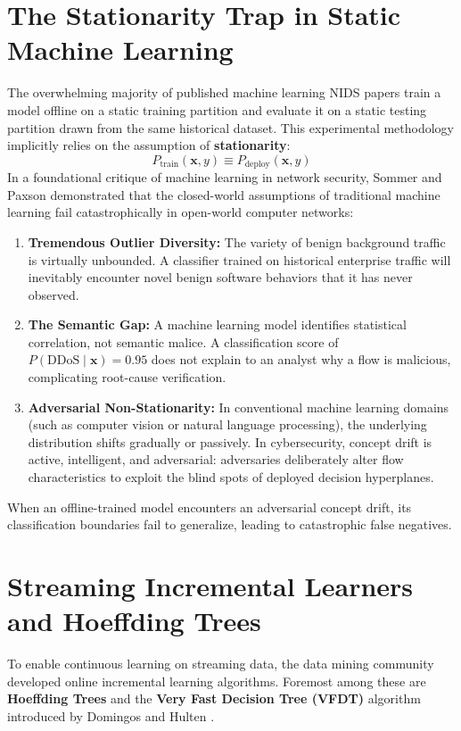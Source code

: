 \documentclass[12pt,a4paper,oneside]{report}
\begin{document}
\section{The Stationarity Trap in Static Machine Learning}
The overwhelming majority of published machine learning NIDS papers train a model offline on a static training partition and evaluate it on a static testing partition drawn from the same historical dataset. This experimental methodology implicitly relies on the assumption of \textbf{stationarity}:
\begin{equation}
P_{\text{train}}(\mathbf{x}, y) \equiv P_{\text{deploy}}(\mathbf{x}, y)
\end{equation}
In a foundational critique of machine learning in network security, Sommer and Paxson \cite{sommer2010} demonstrated that the closed-world assumptions of traditional machine learning fail catastrophically in open-world computer networks:
\begin{enumerate}
    \item \textbf{Tremendous Outlier Diversity:} The variety of benign background traffic is virtually unbounded. A classifier trained on historical enterprise traffic will inevitably encounter novel benign software behaviors that it has never observed.
    \item \textbf{The Semantic Gap:} A machine learning model identifies statistical correlation, not semantic malice. A classification score of $P(\text{DDoS} \mid \mathbf{x}) = 0.95$ does not explain to an analyst why a flow is malicious, complicating root-cause verification.
    \item \textbf{Adversarial Non-Stationarity:} In conventional machine learning domains (such as computer vision or natural language processing), the underlying distribution shifts gradually or passively. In cybersecurity, concept drift is active, intelligent, and adversarial: adversaries deliberately alter flow characteristics to exploit the blind spots of deployed decision hyperplanes.
\end{enumerate}

When an offline-trained model encounters an adversarial concept drift, its classification boundaries fail to generalize, leading to catastrophic false negatives.

\section{Streaming Incremental Learners and Hoeffding Trees}
To enable continuous learning on streaming data, the data mining community developed online incremental learning algorithms. Foremost among these are \textbf{Hoeffding Trees} and the \textbf{Very Fast Decision Tree (VFDT)} algorithm introduced by Domingos and Hulten \cite{domingos2000}.
\end{document}
